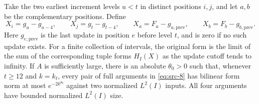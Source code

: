 \begin{lemma}
\label{lem:two-accuracy-expansion}
Take the two earliest increment levels $u<t$ in distinct positions
$i,j$, and let $a,b$ be the complementary positions.  Define
\begin{equation*}
 X_i=g_u-g_{u-4},\qquad X_j=g_t-g_{t-4},\qquad
 X_a=F_a-g_{a,\mathrm{prev}},\qquad
 X_b=F_b-g_{b,\mathrm{prev}}.
\tag{8}\label{eq:src-8}
\end{equation*}
Here $g_{e,\mathrm{prev}}$ is the last update in position $e$ before
level $t$, and is zero if no such update exists.  For a finite
collection of intervals, the original form is the limit of the
sum of the corresponding tuple forms $H_I(X)$ as the update cutoff
tends to infinity.  If $A$ is sufficiently large, there is an
absolute $\theta_0>0$ such that, whenever $t\ge12$ and $k=k_t$,
every pair of full arguments in \eqref{eq:src-8} has bilinear form
norm at most $e^{-2k^{\theta_0}}$ against two normalized $L^2(I)$
inputs.  All four arguments have bounded normalized $L^2(I)$ size.
\end{lemma}

